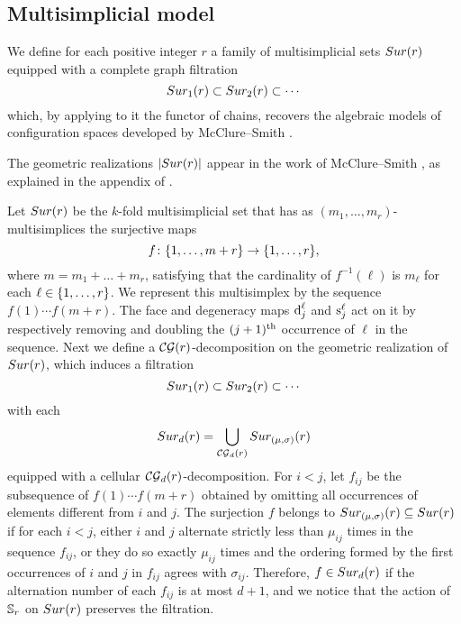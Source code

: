 \subsection{Multisimplicial model}\label{ss:surjection model}

We define for each positive integer $r$ a family of multisimplicial sets $Sur(r)$ equipped with a complete graph filtration
\[
 Sur_{1}(r) \subset Sur_{2}(r) \subset \dotsb
\]
which, by applying to it the functor of chains, recovers the algebraic models of configuration spaces developed by McClure--Smith \cite{mcluresmith2004geomodel}.

The geometric realizations $\lvert Sur(r)\rvert$ appear in the work of McClure--Smith \cite{mcclure2003multivariable}, as explained in the appendix of \cite{salvatore2009deligne}.

Let $Sur(r)$ be the $k$-fold multisimplicial set that has as $(m_1,\dots,m_r)$-multisimplices
the surjective maps
\[
f \colon \{1,\dots,m+r\} \to \{1,\dots,r\},
\]
where $m = m_1+\dots+m_r$, satisfying that the cardinality of $f^{-1}(\ell)$ is $m_\ell$ for each $\ell \in \{1,\dots,r\}$.
We represent this multisimplex by the sequence $f(1) \dotsm f(m+r)$.
The face and degeneracy maps $\operatorname{d}^\ell_j$ and $\operatorname{s}^\ell_j$ act on it by respectively removing and doubling the $(j+1)^{\mathrm{th}}$ occurrence of $\ell$ in the sequence.
Next we define a $\mathcal{CG}(r)$-decomposition on the geometric realization of $Sur(r)$, which induces a filtration
\[
Sur_1(r) \subset Sur_2(r) \subset \dotsb
\]
with each
\[
Sur_d(r) = \bigcup_{\mathcal{CG}_d(r)} Sur_{(\mu,\sigma)}(r)
\]
equipped with a cellular $\mathcal{CG}_d(r)$-decomposition.
For $i<j$, let $f_{ij}$ be the subsequence of $f(1) \dotsm f(m+r)$ obtained by omitting all occurrences of elements different from $i$ and $j$.
The surjection $f$ belongs to $Sur_{(\mu,\sigma)}(r) \subseteq Sur(r)$ if for each $i<j$, either $i$ and $j$ alternate strictly less than $\mu_{ij}$ times in the sequence $f_{ij}$, or they do so exactly $\mu_{ij}$ times and the ordering formed by the first occurrences of $i$ and $j$ in $f_{ij}$ agrees with $\sigma_{ij}$.
Therefore, $f \in Sur_{d}(r)$ if the alternation number of each $f_{ij}$ is at most $d+1$, and we notice that
the action of $\mathbb{S}_r$ on $Sur(r)$ preserves the filtration.

